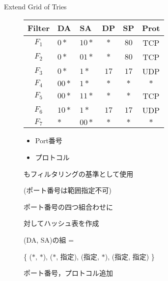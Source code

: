 \documentclass[a4paper,10pt]{jarticle}
\makeatletter
\newcommand{\tblcaption}[1]{\def\@captype{table}\caption{#1}}
\makeatother
\begin{document}
\begin{frame}{Extend Grid of Tries}

\begin{figure}[h]
 \def\@captype{table}
 \begin{minipage}[t]{.5\textwidth}
  {\scriptsize
  {\centering
  \begin{tabular}{c|l|l|c|c|c} 
   Filter   & DA      & SA     & DP     & SP     & Prot \\ \hline
   $F_{1} $ & $0*$    & $10*$  & $*$    & $80$   & TCP  \\ \hline
   $F_{2} $ & $0*$    & $01*$  & $*$    & $80$   & TCP  \\ \hline
   $F_{3} $ & $0*$    & $1*$   & $17$   & $17$   & UDP \\ \hline
   $F_{4} $ & $00*$   & $1*$   & $*$    & $*$    & $*$ \\ \hline
   $F_{5} $ & $00*$   & $11*$  & $*$    & $*$    & TCP \\ \hline
   $F_{6} $ & $10*$   & $1*$   & $17$   & $17$   & UDP \\ \hline
   $F_{7} $ & $*$     & $00*$  & $*$    & $*$    & $*$
  \end{tabular}
  \tblcaption{ポート番号，プロトコル追加}

  }
  }
  \end{minipage}
  \hfill
  \begin{minipage}[c]{.48\textwidth}
   \begin{itemize}
    \item Port番号
    \item プロトコル
   \end{itemize}
   もフィルタリングの基準として使用

\par
(ポート番号は範囲指定不可)
\par
\vspace{5mm}
ポート番号の四つ組合わせに \par 対してハッシュ表を作成
\par
\vspace{2mm}
(DA, SA)の組 =
\par  \{ ($*$, $*$), ($*$, 指定), (指定, $*$), (指定, 指定) \} 
  \end{minipage}
\end{figure}

\end{frame}
\end{document}
